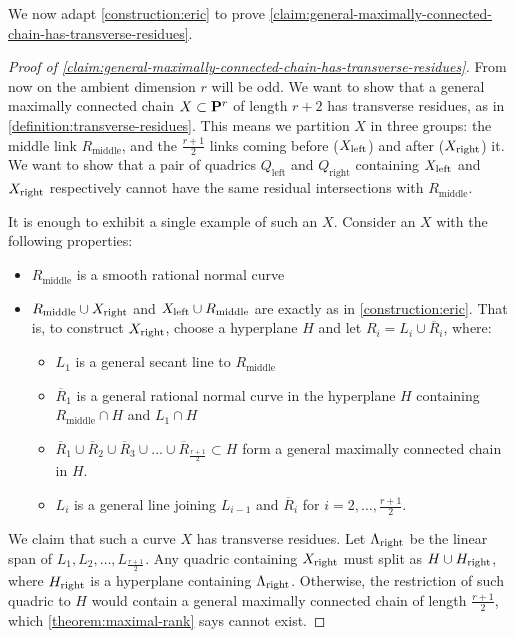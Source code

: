 \documentclass[11pt, two side, letterpaper, final]{amsart}
\renewcommand{\P}{{\bf P}}
\begin{document}
\newcommand{\Rmiddle}{R_{\text{middle}}}

We now adapt \cref{construction:eric} to prove \cref{claim:general-maximally-connected-chain-has-transverse-residues}.

\begin{proof}[Proof of \cref{claim:general-maximally-connected-chain-has-transverse-residues}]
From now on the ambient dimension $r$ will be odd. We want to show that a general maximally connected chain $X\subset \P^r$ of length $r+2$ has transverse residues, as in \cref{definition:transverse-residues}. This means we
partition $X$ in three groups: the middle link $\Rmiddle$, and the $\frac{r+1}{2}$ links coming before ($X_{\text{left}}$) and after ($X_{\text{right}}$) it. We want to show that a pair of
quadrics $Q_{\text{left}}$ and $ Q_{\text{right}}$ containing $X_{\text{left}}$ and $X_{\text{right}}$ respectively cannot have the same residual intersections with $\Rmiddle$.

It is enough to exhibit a single example of such an $X$. Consider an $X$ with the following properties:
\begin{itemize}
    \item $\Rmiddle$ is a smooth rational normal curve
    \item $\Rmiddle \cup \Xright$ and $\Xleft \cup \Rmiddle$ are exactly as in \cref{construction:eric}. That is, to construct $X_{\text{right}}$, choose a hyperplane $H$ and let $R_i=L_i \cup \overline{R}_i$, where:
    \begin{itemize}
        \item $L_1$ is a general secant line to $\Rmiddle$
        \item $\overline{R}_1$ is a general rational normal curve in the hyperplane $H$ containing $\Rmiddle \cap H$ and $L_1 \cap H$
        \item $\overline{R}_1\cup \overline{R}_2\cup \overline{R}_3 \cup \ldots \cup \overline{R}_{\frac{r+1}{2}}\subset H$ form a 
        general maximally connected chain in $H$.
        \item $L_{i}$ is a general line joining $L_{i-1}$ and $\overline{R}_{i}$ for $i=2,\ldots,\frac{r+1}{2}$.
    \end{itemize}
\end{itemize}

 We claim that such a curve $X$ has transverse residues.    Let $\Lambda_{\text{right}}$ be the linear span of $L_1,L_2,\ldots, L_{\frac{r+1}{2}}$. Any quadric containing $X_{\text{right}}$ must split as $H \cup H_{\text{right}}$, where $H_{\text{right}}$ is a hyperplane containing $\Lambda_{\text{right}}$. Otherwise, the restriction of such quadric to $H$ would contain a general maximally connected chain of length $\frac{r+1}{2}$, which \cref{theorem:maximal-rank} says cannot exist.


\end{proof}
\end{document}
